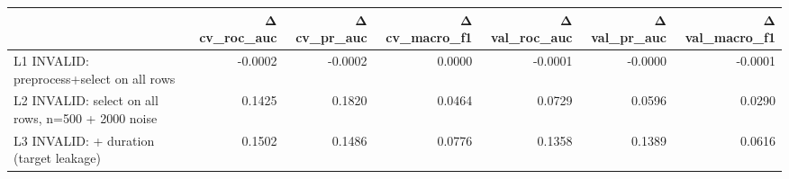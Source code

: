 \begin{tabular}{lrrrrrr}
\toprule
 & Δ cv\_roc\_auc & Δ cv\_pr\_auc & Δ cv\_macro\_f1 & Δ val\_roc\_auc & Δ val\_pr\_auc & Δ val\_macro\_f1 \\
\midrule
L1  INVALID: preprocess+select on all rows & -0.0002 & -0.0002 & 0.0000 & -0.0001 & -0.0000 & -0.0001 \\
L2  INVALID: select on all rows, n=500 + 2000 noise & 0.1425 & 0.1820 & 0.0464 & 0.0729 & 0.0596 & 0.0290 \\
L3  INVALID: + duration (target leakage) & 0.1502 & 0.1486 & 0.0776 & 0.1358 & 0.1389 & 0.0616 \\
\bottomrule
\end{tabular}
